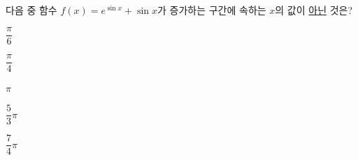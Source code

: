 다음 중 함수 $f(x)=e^{\sin x}+\sin x$가 증가하는 구간에 속하는 $x$의 값이 \underline{아닌} 것은? 
\begin{choices32}{\rule[-3ex]{0pt}{8ex}$\dfrac{\pi}{6}$}{\rule[-3ex]{0pt}{8ex}$\dfrac{\pi}{4}$}{\rule[-3ex]{0pt}{8ex}$\pi$}{\rule[-3ex]{0pt}{8ex}$\dfrac{5}{3}\pi$}{\rule[-3ex]{0pt}{8ex}$\dfrac{7}{4}\pi$}\end{choices32}
